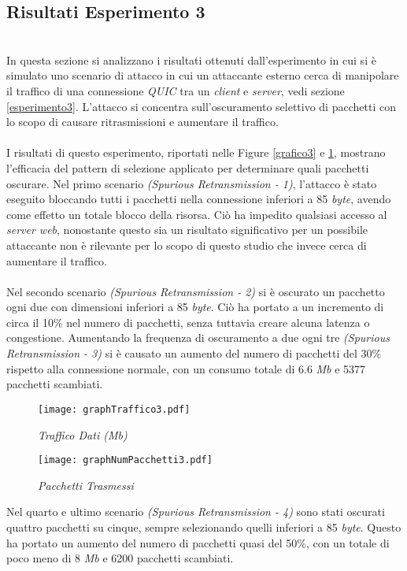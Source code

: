 \subsection{Risultati Esperimento 3}
~\\
\indent In questa sezione si analizzano i risultati ottenuti dall’esperimento in cui si è simulato
uno scenario di attacco in cui un attaccante esterno cerca di manipolare il traffico di una connessione \emph{QUIC} tra un \emph{client} e \emph{server}, vedi sezione \ref{esperimento3}.
L'attacco si concentra sull'oscuramento selettivo di pacchetti con lo scopo di causare ritrasmissioni e aumentare il traffico.
\\\\
I risultati di questo esperimento, riportati nelle Figure \ref{grafico3} e \ref{grafico32}, mostrano l'efficacia del pattern di selezione applicato per determinare quali pacchetti oscurare. 
Nel primo scenario \emph{(Spurious Retransmission - 1)}, l'attacco è stato eseguito bloccando tutti i pacchetti nella connessione inferiori a 85 \emph{byte}, avendo come effetto un totale blocco della risorsa.
Ciò ha impedito qualsiasi accesso al \emph{server web}, nonostante questo sia un risultato significativo per un possibile attaccante non è rilevante per lo scopo di questo studio che invece cerca di aumentare il traffico.
\\\\
Nel secondo scenario \emph{(Spurious Retransmission - 2)} si è oscurato un pacchetto ogni due con dimensioni inferiori a 85 \emph{byte}. Ciò ha portato a un incremento di circa il 10\% nel numero di pacchetti, senza tuttavia creare alcuna latenza o congestione.
Aumentando la frequenza di oscuramento a due ogni tre \emph{(Spurious Retransmission - 3)} si è causato un aumento del numero di pacchetti del 30\% rispetto alla connessione normale, con un consumo totale di 6.6 \emph{Mb} e 5377 pacchetti scambiati.
\begin{figure}[ht]
    \centering
    \begin{minipage}{0.48\textwidth}
        \centering
        \texttt{[image: graphTraffico3.pdf]}
        \caption{\emph{Traffico Dati (Mb)}}
        \label{grafico3}
    \end{minipage}
    \hfill
    \begin{minipage}{0.48\textwidth}
        \centering 
        \texttt{[image: graphNumPacchetti3.pdf]}
        \caption{\emph{Pacchetti Trasmessi}}
        \label{grafico32}
    \end{minipage}
\end{figure}
Nel quarto e ultimo scenario \emph{(Spurious Retransmission - 4)} sono stati oscurati quattro pacchetti su cinque, sempre selezionando quelli inferiori a 85 \emph{byte}.
Questo ha portato un aumento del numero di pacchetti quasi del 50\%, con un totale di poco meno di 8 \emph{Mb} e 6200 pacchetti scambiati.